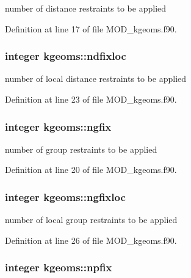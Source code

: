 number of distance restraints to be applied 



Definition at line 17 of file M\-O\-D\-\_\-kgeoms.\-f90.

\hypertarget{classkgeoms_a424e1211b0caf006b3ebbda43eb634fa}{
\subsubsection[{ndfixloc}]{\setlength{\rightskip}{0pt plus 5cm}integer kgeoms\-::ndfixloc}}\label{classkgeoms_a424e1211b0caf006b3ebbda43eb634fa}


number of local distance restraints to be applied 



Definition at line 23 of file M\-O\-D\-\_\-kgeoms.\-f90.

\hypertarget{classkgeoms_a83d5ee51e0109dd1d1447a9d7c4a68aa}{
\subsubsection[{ngfix}]{\setlength{\rightskip}{0pt plus 5cm}integer kgeoms\-::ngfix}}\label{classkgeoms_a83d5ee51e0109dd1d1447a9d7c4a68aa}


number of group restraints to be applied 



Definition at line 20 of file M\-O\-D\-\_\-kgeoms.\-f90.

\hypertarget{classkgeoms_a676005c8b83a0f2a3ceb53b41ab9db67}{
\subsubsection[{ngfixloc}]{\setlength{\rightskip}{0pt plus 5cm}integer kgeoms\-::ngfixloc}}\label{classkgeoms_a676005c8b83a0f2a3ceb53b41ab9db67}


number of local group restraints to be applied 



Definition at line 26 of file M\-O\-D\-\_\-kgeoms.\-f90.

\hypertarget{classkgeoms_a4e638b8d3d6424e0bd535247a9341c30}{
\subsubsection[{npfix}]{\setlength{\rightskip}{0pt plus 5cm}integer kgeoms\-::npfix}}\label{classkgeoms_a4e638b8d3d6424e0bd535247a9341c30}


